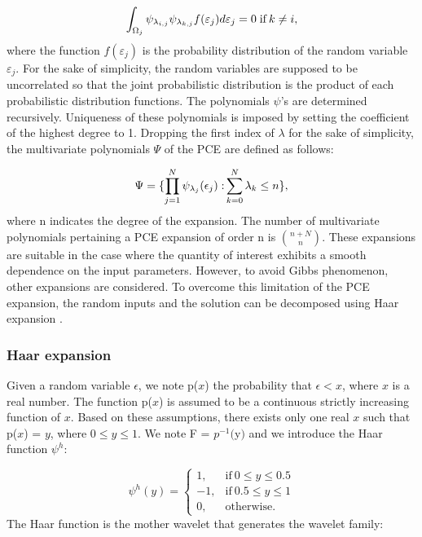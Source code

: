 \documentclass[oneside,11pt,times]{book}
\begin{document}
\begin{equation}
  \int_{\Omega_{j}} \psi_{\lambda_{i,j}} \psi_{\lambda_{k,j}} f(\varepsilon_{j})d\varepsilon_{j} = 0 \; \textnormal{if} \: k \neq i,
  \label{orthogonality}
\end{equation}
where the function $f(\varepsilon_{j})$ is the probability distribution of the random variable $\varepsilon_{j}$. For the sake of simplicity, the random variables are supposed to be uncorrelated so that the joint probabilistic distribution is the product of each probabilistic distribution functions.  The polynomials $\psi$'s are determined recursively. Uniqueness of these polynomials is imposed by setting the coefficient of the highest degree to 1. Dropping the first index of $\lambda$ for the sake of simplicity, the multivariate polynomials $\Psi$ of the PCE are defined as follows:

\begin{eqnarray}
\Psi =  \{\prod_{j=1}^{N} \psi_{\lambda_{j}}(\epsilon_{j}) \;
\textnormal{:} \sum_{k=0}^{N}\lambda_{k}\leq n\}
\label{PCEMulti},
\end{eqnarray}
where n indicates the degree of the expansion. The number of multivariate polynomials pertaining a PCE expansion of order n is $\binom{n+N}{n} $. These expansions are suitable in the case where the quantity of interest exhibits a smooth dependence on the input parameters. However, to avoid Gibbs phenomenon, other expansions are considered.
To overcome this limitation of the PCE expansion, the random inputs and the solution can be decomposed using Haar expansion \citep{Walnut2002}.

\subsubsection{Haar expansion}\label{sec: Haar}

Given a random variable $\epsilon$, we note p($x$) the probability that $\epsilon < x$, where $x$ is a real number. The function p($x$) is assumed to be a continuous strictly increasing function of $x$. Based on these assumptions, there exists only one real $x$ such that p($x$) = $y$, where $0 \leq y \leq 1$. We note F = $p^{-1}($y$)$ and we introduce the Haar function $\psi^{h}$:

\begin{equation*}
\label{Haar}
\psi^{h}(y) = \begin{cases}
1, & \text{if} \ 0 \leq y \le 0.5\\
-1, & \text{if} \ 0.5 \leq y \le 1\\
0, &\text{otherwise}.
\end{cases}
\end{equation*}
The Haar function is the mother wavelet that generates the wavelet family:
\end{document}
